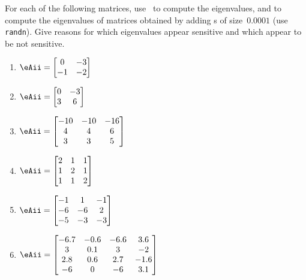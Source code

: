\begin{exercise} \label{ex:} 
For each of the following matrices, use \script\ to compute the eigenvalues, and to compute the eigenvalues of matrices obtained by adding s of size~\(0.0001\) (use \verb|randn|).
Give reasons for which eigenvalues appear sensitive and which appear to be not sensitive.
\begin{enumerate}
\item \(\eAii=\begin{bmatrix} 0&-3\\-1&-2 \end{bmatrix}\)

\item \(\eAii=\begin{bmatrix} 0&-3\\3&6 \end{bmatrix}\)

\item \(\eAii=\begin{bmatrix} -10 & -10 & -16
\\4 & 4 & 6
\\3 & 3 & 5 \end{bmatrix}\)

\item \(\eAii=\begin{bmatrix} 2&1&1
\\1&2&1
\\1&1&2 \end{bmatrix}\)

\item \(\eAii=\begin{bmatrix} -1 & 1 & -1
\\-6 & -6 & 2
\\-5 & -3 & -3 \end{bmatrix}\)

\item \(\eAii=\begin{bmatrix} -6.7 & -0.6 & -6.6 & 3.6
\\3 & 0.1 & 3 & -2
\\2.8 & 0.6 & 2.7 & -1.6
\\-6 & 0 & -6 & 3.1 \end{bmatrix}\)
\setbox\ajrqrbox\hbox{\qrcode{%
[-6.7 -0.6 -6.6 3.6
3 0.1 3 -2
2.8 0.6 2.7 -1.6
-6 0 -6 3.1]
}}\marginpar{\usebox{\ajrqrbox}}%


\end{enumerate}
\end{exercise}
